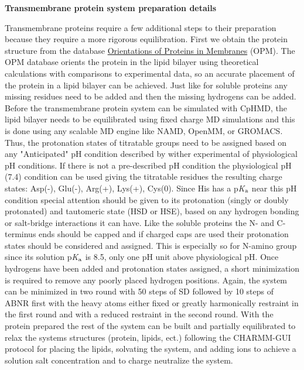 \documentclass[9pt,tutorial]{livecoms}
\newcommand{\pka}{p\textit{K}$_{\rm a}$}
\begin{document}
\noindent
\textbf{Transmembrane protein system preparation details}

Transmembrane proteins require a few additional steps to their preparation because they require a more rigorous equilibration. 
First we obtain the protein structure from the database \href{https://opm.phar.umich.edu/}{Orientations of Proteins in Membranes} (OPM). 
The OPM database orients the protein in the lipid bilayer using theoretical calculations with comparisons to experimental data, so an accurate placement of the protein in a lipid bilayer can be achieved.\cite{Lomize_Bioinformatics_2006_v22_p623}
Just like for soluble proteins any missing residues need to be added and then the missing hydrogens can be added.
Before the transmembrane protein system can be simulated with CpHMD, the lipid bilayer needs to be equilibrated using fixed charge MD simulations and this is done using any scalable MD engine like NAMD,\cite{Phillips_JComputChem_2005_v26_p1781} OpenMM,\cite{Eastman_PLoSComputBiol_2017_v13_pe1005659} or GROMACS.\cite{Abraham_SoftwareX_2015_v1-2_p19}
Thus, the protonation states of titratable groups need to be assigned based on any "Anticipated" pH condition described by wither experimental of physiological pH conditions. 
If there is not a pre-described pH condition the physiological pH (7.4) condition can be used giving the titratable residues the resulting charge states: Asp(-), Glu(-), Arg(+), Lys(+), Cys(0). 
Since His has a {\pka} near this pH condition special attention should be given to its protonation (singly or doubly protonated) and tautomeric state (HSD or HSE), based on any hydrogen bonding or salt-bridge interactions it can have. 
Like the soluble proteins the N- and C-terminus ends should be capped and if charged caps are used their protonation states should be considered and assigned. 
This is especially so for N-amino group since its solution {\pka} is 8.5,\cite{Nozaki_MethodsEnzymol_1967_v11_p715} only one pH unit above physiological pH.
Once hydrogens have been added and protonation states assigned, a short minimization is required to remove any poorly placed hydrogen positions.
Again, the system can be minimized in two round with 50 steps of SD followed by 10 steps of ABNR first with the heavy atoms either fixed or greatly harmonically restraint in the first round and with a reduced restraint in the second round.
With the protein prepared the rest of the system can be built and partially equilibrated to relax the systems structures (protein, lipids, ect.) following the CHARMM-GUI protocol for placing the lipids, solvating the system, and adding ions to achieve a solution salt concentration and to charge neutralize the system.\cite{Jo_PLoSONE_2007_v2_pe880}
\end{document}
